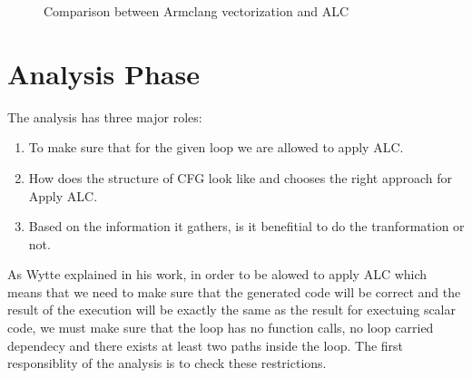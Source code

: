 \documentclass[\main/thesis.tex]{subfiles}
\begin{document}
\begin{figure}%
    \centering
    \qquad
    \caption{Comparison between Armclang vectorization and ALC}%
    \label{fig:example}%
\end{figure}




\section{Analysis Phase}

The analysis has three major roles:
\begin{enumerate}
    \item To make sure that for the given loop we are allowed to apply ALC.
    \item How does the structure of CFG look like and chooses the right approach for Apply ALC.
    \item Based on the information it gathers, is it benefitial to do the tranformation or not.
\end{enumerate}

As Wytte explained in his work, in order to be alowed to apply ALC which means that we need to make sure that the generated code will be correct and the result of the execution will be exactly the same as the result for exectuing scalar code, we must make sure that the loop has no function calls, no loop carried dependecy and there exists at least two paths inside the loop. The first responsiblity of the analysis is to check these restrictions.
\end{document}
